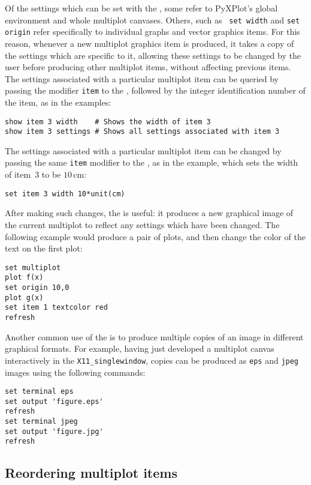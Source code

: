 Of the settings which can be set with the , some refer to
PyXPlot's global environment and whole multiplot canvases. Others, such as {\tt
set width} and {\tt set origin} refer specifically to individual graphs and
vector graphics items. For this reason, whenever a new multiplot graphics item
is produced, it takes a copy of the settings which are specific to it, allowing
these settings to be changed by the user before producing other multiplot
items, without affecting previous items. The settings associated with a
particular multiplot item can be queried by passing the modifier {\tt item} to
the , followed by the integer identification number of the item,
as in the examples:
\begin{verbatim}
show item 3 width    # Shows the width of item 3
show item 3 settings # Shows all settings associated with item 3
\end{verbatim}

The settings associated with a particular multiplot item can be changed by
passing the same {\tt item} modifier to the , as in the example,
which sets the width of item~3 to be $10\,\mathrm{cm}$:
\begin{verbatim}
set item 3 width 10*unit(cm)
\end{verbatim}
After making such changes, the  is useful: it produces a new
graphical image of the current multiplot to reflect any settings which have
been changed. The following example would produce a pair of plots, and then
change the color of the text on the first plot:
\begin{verbatim}
set multiplot
plot f(x)
set origin 10,0
plot g(x)
set item 1 textcolor red
refresh
\end{verbatim}

Another common use of the  is to produce multiple
copies of an image in different graphical formats. For example, having just
developed a multiplot canvas interactively in the {\tt X11\_singlewindow},
copies can be produced as {\tt eps} and {\tt jpeg} images using the following
commands:
\begin{verbatim}
set terminal eps
set output 'figure.eps'
refresh
set terminal jpeg
set output 'figure.jpg'
refresh
\end{verbatim}

\subsection{Reordering multiplot items}

